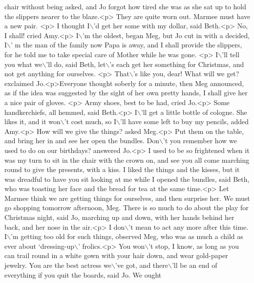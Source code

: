 \begin{DoxyCode}
{       chair without being asked, and Jo forgot how tired she was as she sat up to hold the slippers nearer to the
       blaze.<p> They are quite worn out. Marmee must have a new pair. <p> I thought I\(\backslash\)'d get her some with my
       dollar,  said Beth.<p> No, I shall!  cried Amy.<p> I\(\backslash\)'m the oldest,  began Meg, but Jo cut in with a decided,  I\(\backslash\)'
      m the man of the family now Papa is away, and I shall provide the slippers, for he told me to take special
       care of Mother while he was gone. <p> I\(\backslash\)'ll tell you what we\(\backslash\)'ll do,  said Beth,  let\(\backslash\)'s each get her
       something for Christmas, and not get anything for ourselves. <p> That\(\backslash\)'s like you, dear! What will we get? 
       exclaimed Jo.<p>Everyone thought soberly for a minute, then Meg announced, as if the idea was suggested by the
       sight of her own pretty hands,  I shall give her a nice pair of gloves. <p> Army shoes, best to be had,  cried
       Jo.<p> Some handkerchiefs, all hemmed,  said Beth.<p> I\(\backslash\)'ll get a little bottle of cologne. She likes it, and
       it won\(\backslash\)'t cost much, so I\(\backslash\)'ll have some left to buy my pencils,  added Amy.<p> How will we give the things?
        asked Meg.<p> Put them on the table, and bring her in and see her open the bundles. Don\(\backslash\)'t you remember
       how we used to do on our birthdays?  answered Jo.<p> I used to be so frightened when it was my turn to sit in
       the chair with the crown on, and see you all come marching round to give the presents, with a kiss. I liked
       the things and the kisses, but it was dreadful to have you sit looking at me while I opened the bundles, 
       said Beth, who was toasting her face and the bread for tea at the same time.<p> Let Marmee think we are
       getting things for ourselves, and then surprise her. We must go shopping tomorrow afternoon, Meg. There is so much
       to do about the play for Christmas night,  said Jo, marching up and down, with her hands behind her back,
       and her nose in the air.<p> I don\(\backslash\)'t mean to act any more after this time. I\(\backslash\)'m getting too old for such
       things,  observed Meg, who was as much a child as ever about `dressing-up\(\backslash\)' frolics.<p> You won\(\backslash\)'t stop, I know,
       as long as you can trail round in a white gown with your hair down, and wear gold-paper jewelry. You are
       the best actress we\(\backslash\)'ve got, and there\(\backslash\)'ll be an end of everything if you quit the boards,  said Jo.  We ought
}
\end{DoxyCode}
